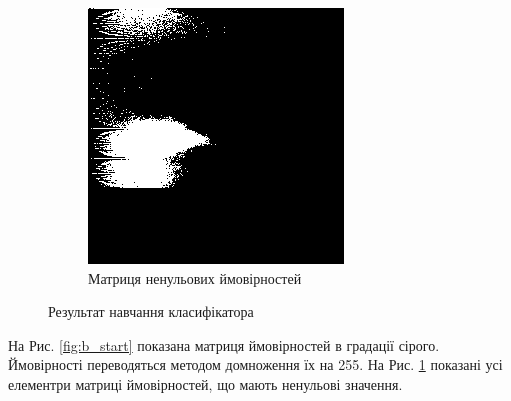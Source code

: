 \begin{figure}[H]
\begin{subfigure}[b]{0.45\textwidth}
		\includegraphics[width=\textwidth]{practise/img/b_start_gen}
		\caption{Матриця ненульових ймовірностей}
		\label{fig:b_start_gen}
	\end{subfigure}
	\caption{Результат навчання класифікатора}
	\label{fig:bayesian_representation_start}
\end{figure}

На Рис. \ref{fig:b_start} показана матриця ймовірностей в градації сірого. Ймовірності переводяться методом домноження їх на 255. На Рис. \ref{fig:b_start_gen} показані усі елементри матриці ймовірностей, що мають ненульові значення.

